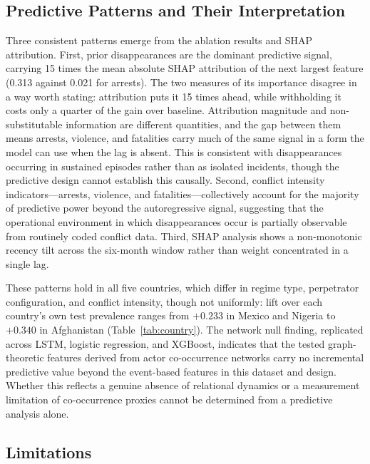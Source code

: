 \documentclass[pdflatex,sn-mathphys-num]{sn-jnl}%
\theoremstyle{thmstyleone}%
\theoremstyle{thmstyletwo}%
\theoremstyle{thmstylethree}%
\begin{document}
\subsection{Predictive Patterns and Their Interpretation}

Three consistent patterns emerge from the ablation results and SHAP attribution. First, prior disappearances are the dominant predictive signal, carrying 15 times the mean absolute SHAP attribution of the next largest feature (0.313 against 0.021 for arrests). The two measures of its importance disagree in a way worth stating: attribution puts it 15 times ahead, while withholding it costs only a quarter of the gain over baseline. Attribution magnitude and non-substitutable information are different quantities, and the gap between them means arrests, violence, and fatalities carry much of the same signal in a form the model can use when the lag is absent. This is consistent with disappearances occurring in sustained episodes rather than as isolated incidents, though the predictive design cannot 
establish this causally. Second, conflict intensity indicators---arrests, violence, and fatalities---collectively account for the majority of predictive power beyond the autoregressive signal, suggesting that the operational environment in which disappearances occur is partially observable from routinely coded conflict data. Third, SHAP analysis shows a non-monotonic recency tilt across the six-month window rather than weight concentrated in a single lag.

These patterns hold in all five countries, which differ in regime type, perpetrator configuration, and conflict intensity, though not uniformly: lift over each country's own test prevalence ranges from $+0.233$ in Mexico and Nigeria to $+0.340$ in Afghanistan (Table~\ref{tab:country}). The network null finding, replicated across LSTM, logistic regression, and XGBoost, indicates that the tested graph-theoretic features derived from actor co-occurrence networks carry no incremental predictive value beyond the event-based features in this dataset and design. Whether this reflects a genuine absence of relational dynamics or a measurement limitation of co-occurrence proxies cannot be determined from a predictive analysis alone.

\subsection{Limitations}
\end{document}
